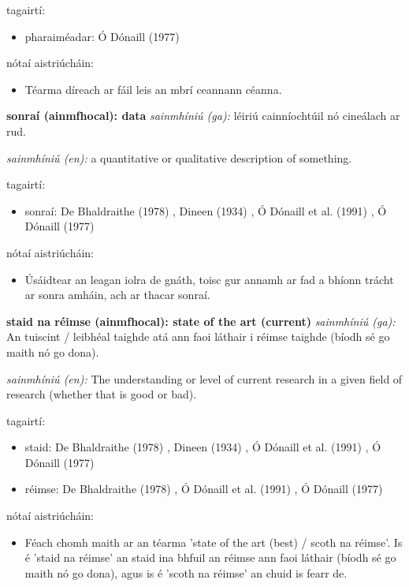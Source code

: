 \documentclass{article}
\begin{document}
tagairtí:
\begin{itemize}
	\item pharaiméadar: Ó Dónaill (1977) \cite{odonaill}
\end{itemize}

nótaí aistriúcháin:
\begin{itemize}
	\item Téarma díreach ar fáil leis an mbrí ceannann céanna.
\end{itemize}


\textbf{sonraí (ainmfhocal): data}
\textit{sainmhíniú (ga):} léiriú cainníochtúil nó cineálach ar rud.

\textit{sainmhíniú (en):} a quantitative or qualitative description of something.

tagairtí:
\begin{itemize}
	\item sonraí: De Bhaldraithe (1978) \cite{de-bhaldraithe}, Dineen (1934) \cite{dineen}, Ó Dónaill et al. (1991) \cite{focloir-beag}, Ó Dónaill (1977) \cite{odonaill}
\end{itemize}

nótaí aistriúcháin:
\begin{itemize}
	\item Úsáidtear an leagan iolra de gnáth, toisc gur annamh ar fad a bhíonn trácht ar sonra amháin, ach ar thacar sonraí.
\end{itemize}


\textbf{staid na réimse (ainmfhocal): state of the art (current)}
\textit{sainmhíniú (ga):} An tuiscint / leibhéal taighde atá ann faoi láthair i réimse taighde (bíodh sé go maith nó go dona).

\textit{sainmhíniú (en):} The understanding or level of current research in a given field of research (whether that is good or bad).

tagairtí:
\begin{itemize}
	\item staid: De Bhaldraithe (1978) \cite{de-bhaldraithe}, Dineen (1934) \cite{dineen}, Ó Dónaill et al. (1991) \cite{focloir-beag}, Ó Dónaill (1977) \cite{odonaill}
	\item réimse: De Bhaldraithe (1978) \cite{de-bhaldraithe}, Ó Dónaill et al. (1991) \cite{focloir-beag}, Ó Dónaill (1977) \cite{odonaill}
\end{itemize}

nótaí aistriúcháin:
\begin{itemize}
	\item Féach chomh maith ar an téarma 'state of the art (best) / scoth na réimse'. Is é 'staid na réimse' an staid ina bhfuil an réimse ann faoi láthair (bíodh sé go maith nó go dona), agus is é 'scoth na réimse' an chuid is fearr de.
\end{itemize}
\end{document}
